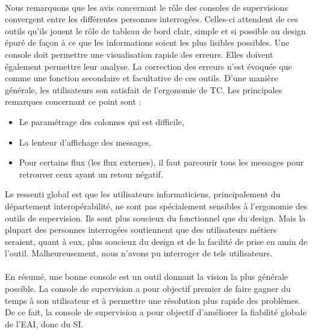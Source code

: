 			\paragraph{}%
			Nous remarquons que les avis concernant le rôle des consoles de supervisions
			convergent entre les différentes personnes interrogées. Celles-ci attendent
			de ces outils qu’ils jouent le rôle de tableau de bord clair, simple et si
			possible au design épuré de façon à ce que les informations soient les plus
			lisibles possibles. Une console doit permettre une visualisation rapide des
			erreurs. Elles doivent également permettre leur analyse. La correction des
			erreurs n’est évoquée que comme une fonction secondaire et facultative de
			ces outils.\newline
			D’une manière générale, les utilisateurs son satisfait de l’ergonomie de TC.
			Les principales remarques concernant ce point sont :
			\begin{itemize}
			  \item Le paramétrage des colonnes qui est difficile,
			  \item La lenteur d’affichage des messages,
			  \item Pour certains flux  (les flux externes), il faut parcourir tous les
			  messages pour retrouver ceux ayant un retour négatif.
			\end{itemize}
			Le ressenti global est que les utilisateurs informaticiens, principalement du
			département interopérabilité, ne sont pas spécialement sensibles à
			l’ergonomie des outils de supervision. Ils sont plus soucieux du fonctionnel
			que du design. Mais la plupart des personnes interrogées soutiennent que des
			utilisateurs métiers seraient, quant à eux, plus soucieux du design et de la
			facilité de prise en amin de l’outil. Malheureusement, nous n’avons pu
			interroger de tels utilisateurs.
			
			\paragraph{}%
			En résumé, une bonne console est un outil donnant la vision la plus générale
			possible. La console de supervision a pour objectif premier de faire gagner
			du temps à son utilisateur et à permettre une résolution plus rapide des
			problèmes. De ce fait, la console de supervision a pour objectif d’améliorer
			la fiabilité globale de l’EAI, donc du SI.
			
